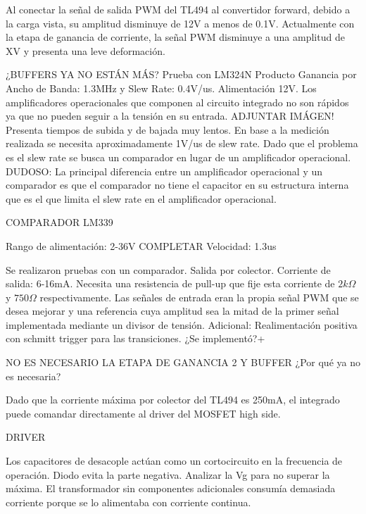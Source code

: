 Al conectar la señal de salida PWM del TL494 al convertidor forward, debido a la carga vista, su amplitud disminuye de 12V a menos de 0.1V. 
Actualmente con la etapa de ganancia de corriente, la señal PWM disminuye a una amplitud de XV y presenta una leve deformación.

¿BUFFERS YA NO ESTÁN MÁS?
Prueba con LM324N
Producto Ganancia por Ancho de Banda: 1.3MHz y Slew Rate: 0.4V/us. 
Alimentación 12V. Los amplificadores operacionales que componen al circuito integrado no son rápidos ya que no pueden seguir a la tensión en su entrada. 
ADJUNTAR IMÁGEN!
Presenta tiempos de subida y de bajada muy lentos. En base a la medición realizada se necesita aproximadamente 1V/us de slew rate. 
Dado que el problema es el slew rate se busca un comparador en lugar de un amplificador operacional. 
DUDOSO:
La principal diferencia entre un amplificador operacional y un comparador es que el comparador
 no tiene el capacitor en su estructura interna que es el que limita el slew rate en el amplificador operacional. 

COMPARADOR LM339

Rango de alimentación: 2-36V
COMPLETAR
Velocidad: 1.3us

Se realizaron pruebas con un comparador. 
Salida por colector. Corriente de salida: 6-16mA. Necesita una resistencia de pull-up que fije esta corriente de $2k\Omega$ y $750\Omega$ respectivamente. 
Las señales de entrada eran la propia señal PWM que se desea mejorar y una referencia cuya amplitud 
sea la mitad de la primer señal implementada mediante un divisor de tensión. 
Adicional: Realimentación positiva con schmitt trigger para las transiciones. ¿Se implementó?+

NO ES NECESARIO LA ETAPA DE GANANCIA 2 Y BUFFER ¿Por qué ya no es necesaria?

Dado que la corriente máxima por colector del TL494 es 250mA, el integrado puede comandar directamente al driver del MOSFET high side. 

DRIVER

Los capacitores de desacople actúan como un cortocircuito en la frecuencia de operación. 
Diodo evita la parte negativa. 
Analizar la Vg para no superar la máxima. 
El transformador sin componentes adicionales consumía demasiada corriente porque se lo alimentaba con corriente continua. 